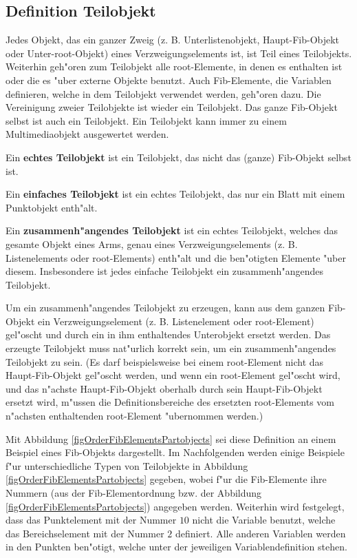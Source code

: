 \subsection{Definition Teilobjekt}

Jedes Objekt, das ein ganzer Zweig (z. B. Unterlistenobjekt, Haupt-Fib-Objekt oder Unter-root-Objekt) eines Verzweigungselements ist, ist Teil eines Teilobjekts. Weiterhin geh"oren zum Teilobjekt alle root-Elemente, in denen es enthalten ist oder die es "uber externe Objekte benutzt. Auch Fib-Elemente, die Variablen definieren, welche in dem Teilobjekt verwendet werden, geh"oren dazu.
Die Vereinigung zweier Teilobjekte ist wieder ein Teilobjekt.
Das ganze Fib-Objekt selbst ist auch ein Teilobjekt.
Ein Teilobjekt kann immer zu einem Multimediaobjekt ausgewertet werden.

Ein \textbf{echtes Teilobjekt} ist ein Teilobjekt, das nicht das (ganze) Fib-Objekt selbst ist.

Ein \textbf{einfaches Teilobjekt} ist ein echtes Teilobjekt, das nur ein Blatt mit einem Punktobjekt enth"alt.

Ein \textbf{zusammenh"angendes Teilobjekt} ist ein echtes Teilobjekt, welches das gesamte Objekt eines Arms, genau eines Verzweigungselements (z. B. Listenelements oder root-Elements) enth"alt und die ben"otigten Elemente "uber diesem. Insbesondere ist jedes einfache Teilobjekt ein zusammenh"angendes Teilobjekt.

Um ein zusammenh"angendes Teilobjekt zu erzeugen, kann aus dem ganzen Fib-Objekt ein Verzweigungselement (z. B. Listenelement oder root-Element) gel"oscht und durch ein in ihm enthaltendes Unterobjekt ersetzt werden. Das erzeugte Teilobjekt muss nat"urlich korrekt sein, um ein zusammenh"angendes Teilobjekt zu sein. (Es darf beispielsweise bei einem root-Element nicht das Haupt-Fib-Objekt gel"oscht werden, und wenn ein root-Element gel"oscht wird, und das n"achste Haupt-Fib-Objekt oberhalb durch sein Haupt-Fib-Objekt ersetzt wird, m"ussen die Definitionsbereiche des ersetzten root-Elements vom n"achsten enthaltenden root-Element "ubernommen werden.)

Mit Abbildung \ref{figOrderFibElementsPartobjects} sei diese Definition an einem Beispiel eines Fib-Objekts dargestellt. Im Nachfolgenden werden einige Beispiele f"ur unterschiedliche Typen von Teil\-objekte in Abbildung \ref{figOrderFibElementsPartobjects} gegeben, wobei f"ur die Fib-Elemente ihre Nummern (aus der Fib-Elementordnung bzw. der Abbildung \ref{figOrderFibElementsPartobjects}) angegeben werden. Weiterhin wird festgelegt, dass das Punktelement mit der Nummer $10$ nicht die Variable benutzt, welche das Bereichselement mit der Nummer $2$ definiert. Alle anderen Variablen werden in den Punkten ben"otigt, welche unter der jeweiligen Variablendefinition stehen.

